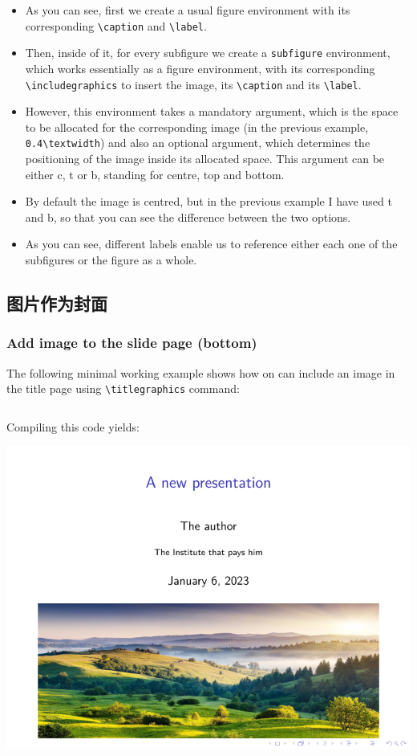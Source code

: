 \begin{column}{0.5\textwidth}
\begin{itemize}
  \item As you can see, first we create a usual figure environment with its corresponding \verb|\caption| and \verb|\label|.
  \item Then, inside of it, for every subfigure we create a \verb|subfigure| environment, which works essentially as a figure environment, with its corresponding \verb|\includegraphics| to insert the image, its \verb|\caption| and its \verb|\label|.
  \item However, this environment takes a mandatory argument, which is the space to be allocated for the corresponding image (in the previous example, \verb|0.4\textwidth|) and also an optional argument, which determines the positioning of the image inside its allocated space. This argument can be either c, t or b, standing for centre, top and bottom.
  \item By default the image is centred, but in the previous example I have used t and b, so that you can see the difference between the two options.
  \item As you can see, different labels enable us to reference either each one of the subfigures or the figure as a whole.
\end{itemize}

\subsection{图片作为封面}

\subsubsection{Add image to the slide page (bottom)}

The following minimal working example shows how on can include an image in the title page using \verb|\titlegraphics| command:

\inputminted[linenos=true]{latex}{examples/beamer/figure-titlepage1.tex}

Compiling this code yields:

\includegraphics{examples/beamer/figure-titlepage1.pdf}


\end{column}
